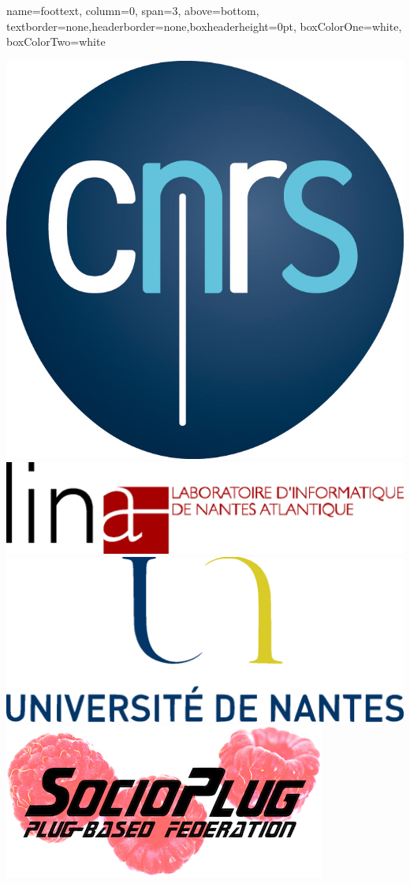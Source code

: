 \documentclass[a1paper, fontscale=0.38, portrait]{baposter}
\begin{document}
\begin{poster}
  \headerbox{}%
  {name=foottext, column=0, span=3, above=bottom,%
    textborder=none,headerborder=none,boxheaderheight=0pt, boxColorOne=white,%
    boxColorTwo=white}{
    \begin{center}
      \includegraphics[scale=0.07]{logos/CNRS.jpg} \hspace{2.75em}
      \includegraphics[scale=0.2]{logos/LINA.eps} \hspace{2.75em}
      \includegraphics[scale=0.2]{logos/UnivNantes.eps} \hspace{2.75em}
      \includegraphics[scale=0.2]{logos/socioplug.png}
    \end{center}
  }


\end{poster}
\end{document}
